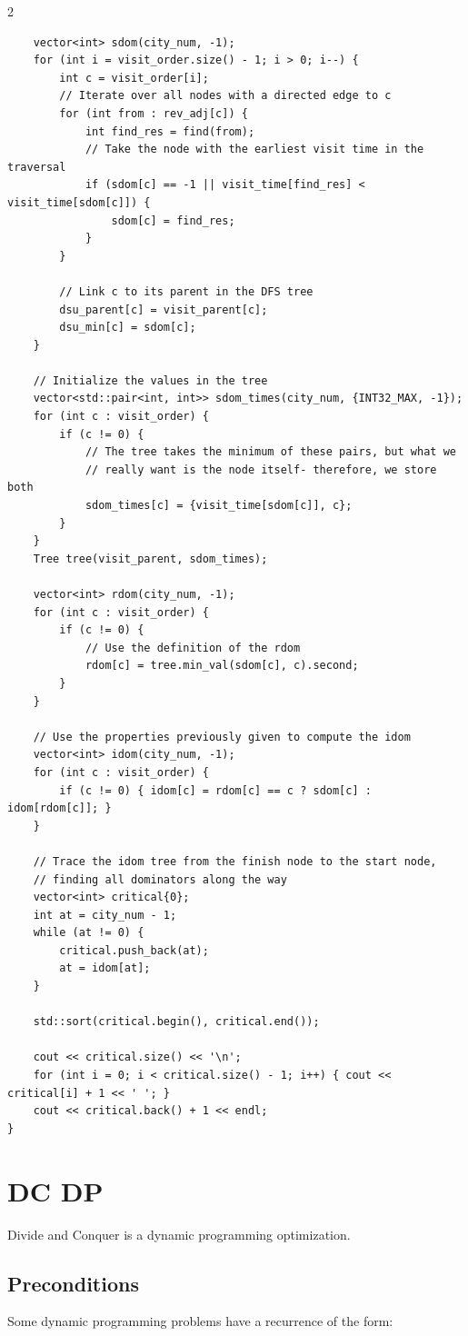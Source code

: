 \documentclass[a4paper,landscape]{article}
\begin{document}
\begin{multicols}{2}
\begin{lstlisting}
	vector<int> sdom(city_num, -1);
	for (int i = visit_order.size() - 1; i > 0; i--) {
		int c = visit_order[i];
		// Iterate over all nodes with a directed edge to c
		for (int from : rev_adj[c]) {
			int find_res = find(from);
			// Take the node with the earliest visit time in the traversal
			if (sdom[c] == -1 || visit_time[find_res] < visit_time[sdom[c]]) {
				sdom[c] = find_res;
			}
		}

		// Link c to its parent in the DFS tree
		dsu_parent[c] = visit_parent[c];
		dsu_min[c] = sdom[c];
	}

	// Initialize the values in the tree
	vector<std::pair<int, int>> sdom_times(city_num, {INT32_MAX, -1});
	for (int c : visit_order) {
		if (c != 0) {
			// The tree takes the minimum of these pairs, but what we
			// really want is the node itself- therefore, we store both
			sdom_times[c] = {visit_time[sdom[c]], c};
		}
	}
	Tree tree(visit_parent, sdom_times);

	vector<int> rdom(city_num, -1);
	for (int c : visit_order) {
		if (c != 0) {
			// Use the definition of the rdom
			rdom[c] = tree.min_val(sdom[c], c).second;
		}
	}

	// Use the properties previously given to compute the idom
	vector<int> idom(city_num, -1);
	for (int c : visit_order) {
		if (c != 0) { idom[c] = rdom[c] == c ? sdom[c] : idom[rdom[c]]; }
	}

	// Trace the idom tree from the finish node to the start node,
	// finding all dominators along the way
	vector<int> critical{0};
	int at = city_num - 1;
	while (at != 0) {
		critical.push_back(at);
		at = idom[at];
	}

	std::sort(critical.begin(), critical.end());

	cout << critical.size() << '\n';
	for (int i = 0; i < critical.size() - 1; i++) { cout << critical[i] + 1 << ' '; }
	cout << critical.back() + 1 << endl;
}
\end{lstlisting}
\hline
\section{DC DP}
\hline
Divide and Conquer is a dynamic programming optimization.

\subsection*{Preconditions}

Some dynamic programming problems have a recurrence of the form:


\end{multicols}
\end{document}
